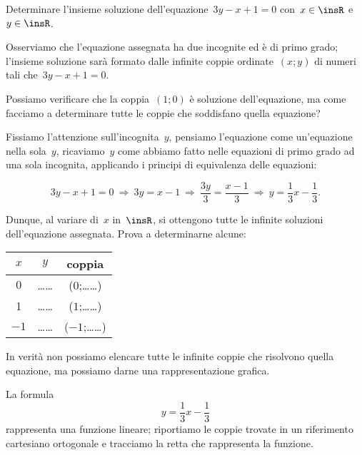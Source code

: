 \begin{exrig}\vspace{1.10ex}
 \begin{esempio}
Determinare l'insieme soluzione dell'equazione~$3y-x+1=0$ con~$x\in\insR$ e~$y\in\insR$.
 \end{esempio}
Osserviamo che l'equazione assegnata ha due incognite ed
è di primo grado; l'insieme soluzione sarà formato
dalle infinite coppie ordinate~$(x;y)$ di numeri tali che~$3y-x+1=0$.

Possiamo verificare che la coppia~$(1;0)$ è soluzione
dell'equazione, ma come facciamo a determinare tutte le
coppie che soddisfano quella equazione?

Fissiamo l'attenzione sull'incognita~$y$,
pensiamo l'equazione come un'equazione
nella sola~$y$, ricaviamo~$y$ come abbiamo fatto nelle equazioni di primo
grado ad una sola incognita, applicando i principi di equivalenza delle
equazioni:

\begin{equation*}
3y-x+1=0\:\Rightarrow\: 3y=x-1\:\Rightarrow\:\frac{3y}{3}=\frac{x-1}{3}\:\Rightarrow\: y=\frac{1}{3}x-\frac{1}{3}.
\end{equation*}

Dunque, al variare di~$x$ in~$\insR$, si ottengono tutte le infinite
soluzioni dell'equazione assegnata.
Prova a determinarne alcune:
\begin{center}
 \begin{tabular}{ccc}
\toprule
$x$ & $y$ & coppia\\
\midrule
$0$ &\ldots\ldots & ($0$;\ldots\ldots)\\
1& \ldots\ldots &($1$;\ldots\ldots)\\
$-1$ & \ldots\ldots & ($-1$;\ldots\ldots)\\
\bottomrule
\end{tabular}
\end{center}

In verità non possiamo elencare tutte le infinite coppie che risolvono
quella equazione, ma possiamo darne una rappresentazione grafica.

\begin{wrapfigure}{o}{0pt}
 
\end{wrapfigure}

La formula \[y=\frac{1}{3}x-\frac{1}{3}\] rappresenta una funzione
lineare; riportiamo le coppie trovate in un riferimento cartesiano
ortogonale e tracciamo la retta che rappresenta la funzione.


\end{exrig}

